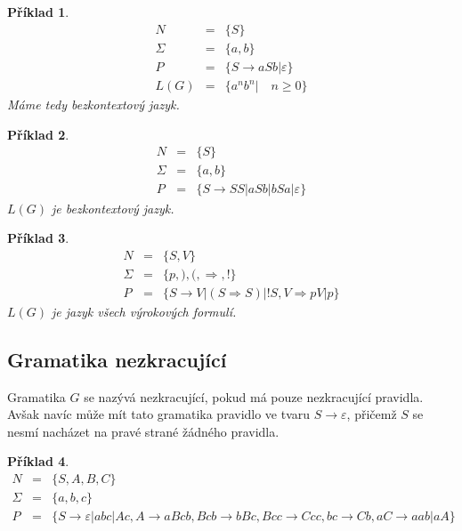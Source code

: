 \documentclass[10pt, a4paper, titlepage]{article}
\theoremstyle{note}
\newtheorem{priklad}{\textbf{Příklad}}
\begin{document}
\vspace{30px}

\begin{priklad}
\begin{eqnarray*}
N &=& \lbrace S \rbrace \\
\Sigma &=& \lbrace a, b \rbrace \\
P &=& \lbrace S \rightarrow aSb | \varepsilon \rbrace \\
L(G) &=& \lbrace a^{n}b^{n} | \quad n \geq 0 \rbrace
\end{eqnarray*}
Máme tedy \emph{bezkontextový} jazyk.
\end{priklad}

\begin{priklad}
\begin{eqnarray*}
N &=& \lbrace S \rbrace \\
\Sigma &=& \lbrace a, b \rbrace \\
P &=& \lbrace S \rightarrow SS|aSb|bSa| \varepsilon \rbrace
\end{eqnarray*}
$L(G)$ je \emph{bezkontextový} jazyk.
\end{priklad}

\begin{priklad}
\begin{eqnarray*}
N &=& \lbrace S, V \rbrace \\
\Sigma &=& \lbrace p,),(, \Rightarrow, ! \rbrace \\
P &=& \lbrace S \rightarrow V|(S \Rightarrow S)|!S, V \Rightarrow pV|p \rbrace
\end{eqnarray*}
$L(G)$ je jazyk všech výrokových formulí.
\end{priklad}


\subsection{Gramatika nezkracující}
Gramatika $G$ se nazývá nezkracující, pokud má pouze nezkracující
pravidla. Avšak navíc může mít tato gramatika pravidlo ve
tvaru $S \rightarrow \varepsilon$, přičemž $S$ se nesmí nacházet na pravé strané žádného pravidla.

\begin{priklad}
\begin{eqnarray*}
N &=& \lbrace S, A, B, C\rbrace \\
\Sigma &=& \lbrace a, b, c\rbrace \\
P &=& \lbrace S \rightarrow \varepsilon |abc|Ac, A \rightarrow aBcb, Bcb \rightarrow bBc, Bcc \rightarrow Ccc, bc \rightarrow Cb, aC \rightarrow aab|aA \rbrace
\end{eqnarray*}
\end{priklad}
\end{document}
